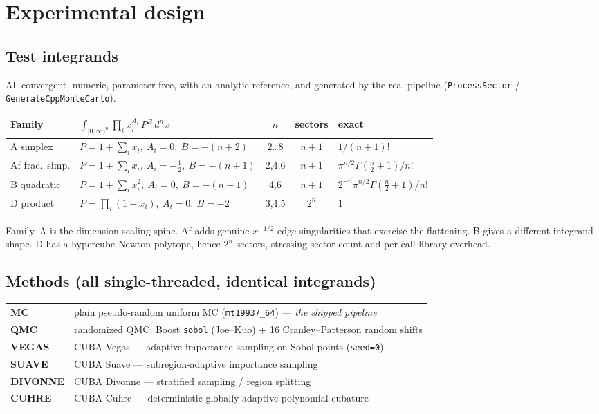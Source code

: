 \documentclass[11pt,a4paper]{article}
\begin{document}
\section{Experimental design}

\subsection{Test integrands}
All convergent, numeric, parameter-free, with an analytic reference, and
generated by the real pipeline (\texttt{ProcessSector} /
\texttt{GenerateCppMonteCarlo}).

\begin{center}\small
\begin{tabular}{@{}llccl@{}}
\toprule
Family & $\displaystyle\int_{[0,\infty)^n}\!\!\prod_i x_i^{A_i}\,P^{B}\,d^nx$ & $n$ & sectors & exact \\
\midrule
A simplex      & $P=1+\sum_i x_i,\ A_i=0,\ B=-(n{+}2)$        & 2\dots8 & $n{+}1$ & $1/(n{+}1)!$ \\
Af frac.\ simp.& $P=1+\sum_i x_i,\ A_i=-\tfrac12,\ B=-(n{+}1)$ & 2,4,6   & $n{+}1$ & $\pi^{n/2}\Gamma(\tfrac n2{+}1)/n!$ \\
B quadratic    & $P=1+\sum_i x_i^2,\ A_i=0,\ B=-(n{+}1)$       & 4,6     & $n{+}1$ & $2^{-n}\pi^{n/2}\Gamma(\tfrac n2{+}1)/n!$ \\
D product      & $P=\prod_i(1{+}x_i),\ A_i=0,\ B=-2$           & 3,4,5   & $2^{n}$ & $1$ \\
\bottomrule
\end{tabular}
\end{center}

\noindent Family~A is the dimension-scaling spine. Af adds genuine $x^{-1/2}$
edge singularities that exercise the flattening. B gives a different integrand
shape. D has a hypercube Newton polytope, hence $2^n$ sectors, stressing sector
count and per-call library overhead.

\subsection{Methods (all single-threaded, identical integrands)}
\begin{center}\small
\begin{tabular}{@{}ll@{}}
\toprule
\textbf{MC}      & plain pseudo-random uniform MC (\texttt{mt19937\_64}) --- \emph{the shipped pipeline} \\
\textbf{QMC}     & randomized QMC: Boost \texttt{sobol} (Joe--Kuo) + 16 Cranley--Patterson random shifts \\
\textbf{VEGAS}   & CUBA Vegas --- adaptive importance sampling on Sobol points (\texttt{seed=0}) \\
\textbf{SUAVE}   & CUBA Suave --- subregion-adaptive importance sampling \\
\textbf{DIVONNE} & CUBA Divonne --- stratified sampling / region splitting \\
\textbf{CUHRE}   & CUBA Cuhre --- deterministic globally-adaptive polynomial cubature \\
\bottomrule
\end{tabular}
\end{center}
\end{document}

